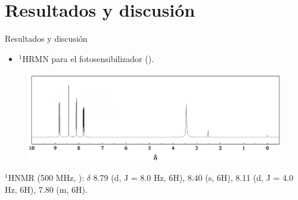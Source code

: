 \documentclass[handout]{beamer}
\begin{document}
\section{Resultados y discusi\'on}
\begin{frame}{Resultados y discusi\'on}
	\begin{itemize}
		\item $^1$HRMN para el fotosensibilizador ().
	\end{itemize}
	\begin{figure}[h]
		\centering
		\includegraphics[width=\linewidth]{sources/hnmr}
	\end{figure}
	$^1$HNMR (500 MHz, ): $\delta$ 8.79 (d, J = 8.0 Hz, 6H), 8.40 (s, 6H), 8.11 (d, J = 4.0 Hz,
	6H), 7.80 (m, 6H).
\end{frame}
\end{document}
